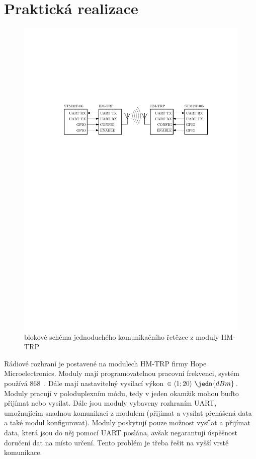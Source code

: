 \section{Praktická realizace}
\begin{figure}[H]
    \begin{center}
        \includegraphics[width=\textwidth]{img/hm-trp}
    \end{center}
    \caption{blokové schéma jednoduchého komunikačního řetězce z moduly HM-TRP}
\end{figure}
Rádiové rozhraní je postavené na modulech HM-TRP firmy Hope Microelectronics. Moduly mají programovatelnou pracovní frekvenci, systém používá 868~. Dále mají nastavitelný vysílací výkon $\in \langle 1; 20 \rangle~\jedn{dBm}$. Moduly pracují v poloduplexním módu, tedy v jeden okamžik mohou buďto přijímat nebo vysílat. Dále jsou moduly vybaveny rozhraním UART, umožnujícím snadnou komunikaci z modulem (přijímat a vysílat přenášená data a také modul konfigurovat). Moduly poskytují pouze možnost vysílat a přijímat data, která jsou do něj pomocí UART poslána, avšak negarantují úspěšnost doručení dat na místo určení. Tento problém je třeba řešit na vyšší vrstě komunikace.
